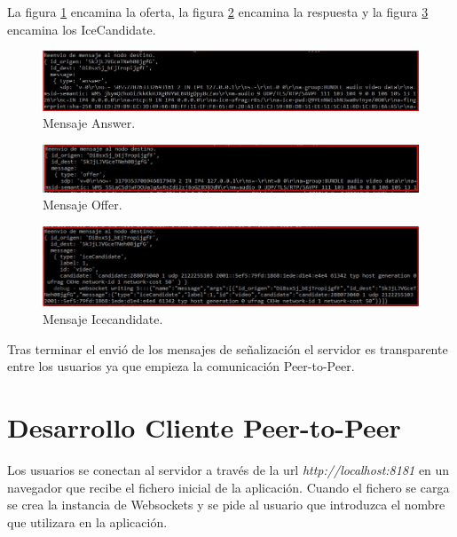 La figura \ref{fig:AnswerServer} encamina la oferta, la figura \ref{fig:OfferServer} encamina la respuesta y la figura \ref{fig:IceCandidateVideos} encamina los IceCandidate.
\begin{figure}[!h]
\begin{center}
   \includegraphics[width=1\linewidth]{Figures/AnswerServer}
	\decoRule
	\caption[Mensaje señalización Answer.]{Mensaje Answer.}
\label{fig:AnswerServer}
\end{center}
\end{figure}
\begin{figure}[!h]
\begin{center}
   \includegraphics[width=1\linewidth]{Figures/OfferServer}
	\decoRule
	\caption[Mensaje señalización Offer.]{ Mensaje Offer.}
\label{fig:OfferServer}
\end{center}
\end{figure}
\begin{figure}[!h]
\begin{center}
   \includegraphics[width=1\linewidth]{Figures/IceCandidateVideos}
	\decoRule
	\caption[Mensaje señalización Icecandidate.]{ Mensaje Icecandidate.}
\label{fig:IceCandidateVideos}
\end{center}
\end{figure}

Tras terminar el envió de los mensajes de señalización el servidor es transparente entre los usuarios ya que empieza la comunicación Peer-to-Peer.
\section{Desarrollo Cliente Peer-to-Peer}
Los usuarios se conectan al servidor a través de la url \textit {http://localhost:8181} en un navegador que recibe el fichero inicial de la aplicación. Cuando el fichero se carga se crea la instancia de Websockets y se pide al usuario que introduzca el nombre que utilizara en la aplicación.
